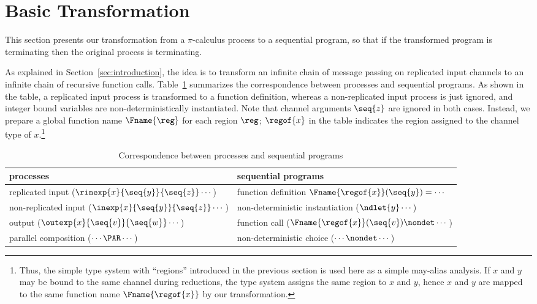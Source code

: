 \section{Basic Transformation}  \label{sec:approach}

This section presents our transformation from
a  \(\pi\)-calculus process to a sequential program,
so that
if the transformed program is terminating then the original process is terminating.

As explained in Section~\ref{sec:introduction}, the idea is to transform
an infinite chain of message passing on replicated input channels to
an infinite chain of recursive function calls.
Table~\ref{tab:trans} summarizes the correspondence between
processes and  sequential programs.
As shown in the table, a replicated input process is transformed to
a function definition, whereas a non-replicated input process is
just ignored, and integer bound variables are non-deterministically instantiated.
Note that channel arguments \(\seq{z}\) are ignored in both cases.
Instead, we prepare a global function name \(\Fname{\reg}\) for each
region \(\reg\); \(\regof{x}\) in the table indicates the region assigned to
the channel type of \(x\).\footnote{Thus, 
  the simple type system with
  ``regions'' introduced in the previous section is used here as a simple
  may-alias analysis.
  If \(x\) and \(y\) may be bound to the same channel during reductions,
  the type system assigns the same region to \(x\) and \(y\),
  hence \(x\) and \(y\) are
  mapped to the same function name \(\Fname{\regof{x}}\) by our transformation.}
  

\begin{table}[tbp]
  \caption{Correspondence between processes and sequential programs}
  \label{tab:trans}
\begin{tabular}{|l|l|}
  \hline
  processes & sequential programs \\
  \hline
  \hline
  replicated input (\(\rinexp{x}{\seq{y}}{\seq{z}}\cdots\)) & function definition  \(\Fname{\regof{x}}(\seq{y})=\cdots\)\\
  \hline
  non-replicated input (\(\inexp{x}{\seq{y}}{\seq{z}}\cdots\)) &
  non-deterministic instantiation (\(\ndlet{y}\cdots\))\\
  \hline
  output (\(\outexp{x}{\seq{v}}{\seq{w}}\cdots\)) &
    function call (\(\Fname{\regof{x}}(\seq{v})\nondet \cdots\))\\
    \hline
    parallel composition (\(\cdots\PAR\cdots\)) &
    non-deterministic choice (\(\cdots\nondet \cdots\))\\
    \hline
\end{tabular}
\end{table}

